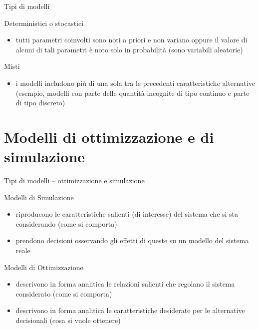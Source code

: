 \documentclass{beamer}
\begin{document}
\begin{frame}{Tipi di modelli}
  \begin{block}{Deterministici o stocastici}
    \begin{itemize}
     \item {tutti parametri coinvolti sono noti a priori e non variano
     oppure il valore di alcuni di tali parametri \`e noto solo in probabilit\`a
     (sono variabili aleatorie)}
    \end{itemize}
  \end{block}
  
  \begin{block}{Misti}
   \begin{itemize}
     \item {i modelli includono pi\`u di una sola tra le precedenti caratteristiche
     alternative (esempio, modelli con parte delle quantit\`a incognite di tipo
     continuo e parte di  tipo discreto)}
    \end{itemize}
  \end{block}
\end{frame}

\section{Modelli di ottimizzazione e di simulazione}

\begin{frame}{Tipi di modelli -- ottimizzazione e simulazione}
  \begin{block}{Modelli di Simulazione}
    \begin{itemize}
      \item riproducono le caratteristiche salienti (di interesse) del sistema che si sta considerando (come si comporta)
      \item prendono decisioni osservando gli effetti di queste su un modello del sistema reale
    \end{itemize}
  \end{block}


  \begin{block}{Modelli di Ottimizzazione}
    \begin{itemize}
      \item descrivono in forma analitica le relazioni salienti che regolano il sistema considerato (come si comporta)
      \item descrivono in forma analitica le caratteristiche desiderate per le alternative decisionali (cosa si vuole ottenere)
    \end{itemize}
  \end{block}
\end{frame}
\end{document}
